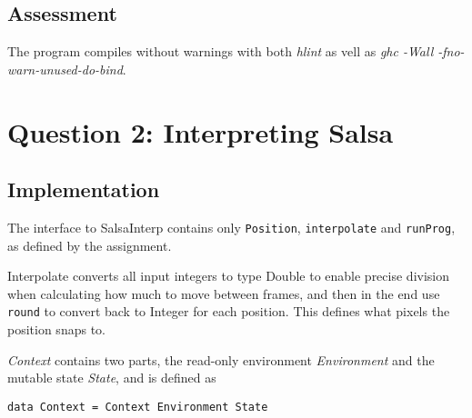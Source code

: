 \documentclass[a4paper, 10pt]{article}
\begin{document}

\subsection{Assessment}
The program compiles without warnings with both \textit{hlint} as vell as \textit{ghc -Wall -fno-warn-unused-do-bind}.




\section{Question 2: Interpreting Salsa}

\subsection{Implementation}
The interface to SalsaInterp contains only \texttt{Position}, \texttt{interpolate} and \texttt{runProg}, as defined by the assignment.

Interpolate converts all input integers to type Double to enable precise division when calculating how much to move between frames, and then in the end use \texttt{round} to convert back to Integer for each position. This defines what pixels the position snaps to.

\textit{Context} contains two parts, the read-only environment \textit{Environment} and the mutable state \textit{State}, and is defined as
\begin{verbatim}
data Context = Context Environment State
\end{verbatim}
\end{document}
